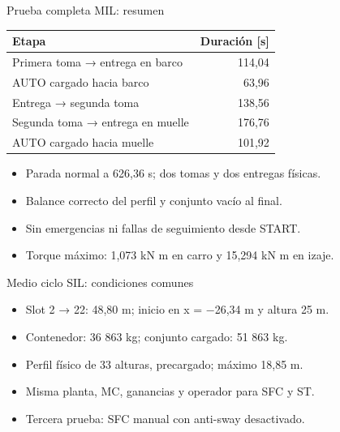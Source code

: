 \documentclass[aspectratio=169,11pt]{beamer}
\begin{document}
\begin{frame}[t,label=slide64]{Prueba completa MIL: resumen}
\begin{center}
{\small\renewcommand{\arraystretch}{1.0}
\begin{tabular}{lr}\toprule
Etapa & Duración [s]\\\midrule
Primera toma → entrega en barco & 114,04\\
AUTO cargado hacia barco & 63,96\\
Entrega → segunda toma & 138,56\\
Segunda toma → entrega en muelle & 176,76\\
AUTO cargado hacia muelle & 101,92\\
\bottomrule\end{tabular}}\end{center}
\begin{itemize}
\item Parada normal a 626,36 s; dos tomas y dos entregas físicas.
\item Balance correcto del perfil y conjunto vacío al final.
\item Sin emergencias ni fallas de seguimiento desde START.
\item Torque máximo: 1,073 kN m en carro y 15,294 kN m en izaje.
\end{itemize}
\end{frame}
\begin{frame}[t,label=slide65]{Medio ciclo SIL: condiciones comunes}
\begin{itemize}
\item Slot 2 → 22: 48,80 m; inicio en x = −26,34 m y altura 25 m.
\item Contenedor: 36 863 kg; conjunto cargado: 51 863 kg.
\item Perfil físico de 33 alturas, precargado; máximo 18,85 m.
\item Misma planta, MC, ganancias y operador para SFC y ST.
\item Tercera prueba: SFC manual con anti-sway desactivado.
\end{itemize}
\end{frame}
\end{document}
